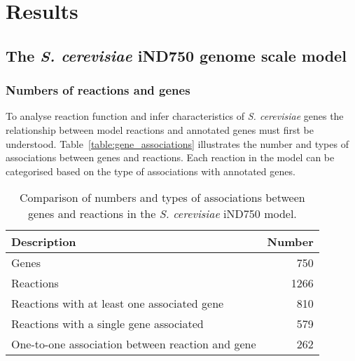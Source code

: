 
\clearpage

\section{Results}%

\subsection{The \emph{S. cerevisiae} iND750 genome scale model}%

\subsubsection{Numbers of reactions and genes}%

To analyse reaction function and infer characteristics of \emph{S. cerevisiae} genes the relationship between model reactions and annotated genes must first be understood. Table~\vref{table:gene_associations} illustrates the number and types of associations between genes and reactions. Each reaction in the model can be categorised based on the type of associations with annotated genes.

\begin{table}[b]%
  \centering
  \begin{tabular}{l r}
                                                                   \toprule
    Description                                      & Number   \\ \midrule
    Genes                                            & 750      \\
    Reactions                                        & 1266     \\
    Reactions with at least one associated gene      & 810      \\
    Reactions with a single gene associated          & 579      \\
    One-to-one association between reaction and gene & 262      \\ \bottomrule
  \end{tabular}
  \caption[Gene associations in the \emph{S. cerevisiae} iND750 model]{Comparison of numbers and types of associations between genes and reactions in the \emph{S. cerevisiae} iND750 model. }
  \label{table:gene_associations}
\end{table}%

